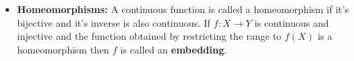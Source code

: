 \documentclass[a4paper]{article}
\newtheorem{theorem}{Theorem}[section]
\begin{document}
\begin{itemize}
\begin{theorem}[Continuous functions on product spaces]
Let $f:A\rightarrow {\displaystyle \prod_{i\in I}X_{i} }$ be a function between topological spaces. We can see that $f(x)=(f_{i}(x))_{i\in I}$ for functions $f_{i}:A\rightarrow X_{i}$. Then, in the product topology $f$ is continuous iff $f_{i}$ is continuous for every $i$.
\end{theorem}

\item
\textbf{Homeomorphisms: }A continuous function is called a homeomorphism if it's bijective and it's inverse is also continuous. If $f:X\rightarrow Y$ is continuous and injective and the function obtained by restricting the range to $f(X)$ is a homeomorphism then $f$ is called an \textbf{embedding}.

\end{itemize}
\end{document}

